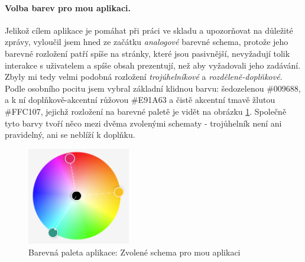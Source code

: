 \paragraph{Volba barev pro mou aplikaci.} Jelikož cílem aplikace je pomáhat při práci ve skladu a upozorňovat na důležité zprávy, vyloučil jsem hned ze začátku \emph{analogové} barevné schema, protože jeho barevné rozložení patří spíše na stránky, které jsou pasivnější, nevyžadují tolik interakce s uživatelem a spíše obsah prezentují, než aby vyžadovali jeho zadávání. Zbyly mi tedy velmi podobná rozložení \emph{trojúhelníkové} a \emph{rozděleně-doplňkové}. Podle osobního pocitu jsem vybral základní klidnou barvu: šedozelenou \#009688, a k ní doplňkově-akcentní růžovou \#E91A63 a čistě akcentní tmavě žlutou \#FFC107, jejichž rozložení na barevné paletě je vidět na obrázku \ref{picture:colors:app}. Společně tyto barvy tvoří něco mezi dvěma zvolenými schematy - trojůhelník není ani pravidelný, ani se neblíží k doplňku.\\
\begin{figure}[]
    \includegraphics[width=0.4\textwidth]{../png/colors/app.png}
    \caption{Barevná paleta aplikace: Zvolené schema pro mou aplikaci} \label{picture:colors:app}
\end{figure}

